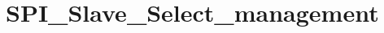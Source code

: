 \hypertarget{group___s_p_i___slave___select__management}{\section{S\-P\-I\-\_\-\-Slave\-\_\-\-Select\-\_\-management}
\label{group___s_p_i___slave___select__management}
}

